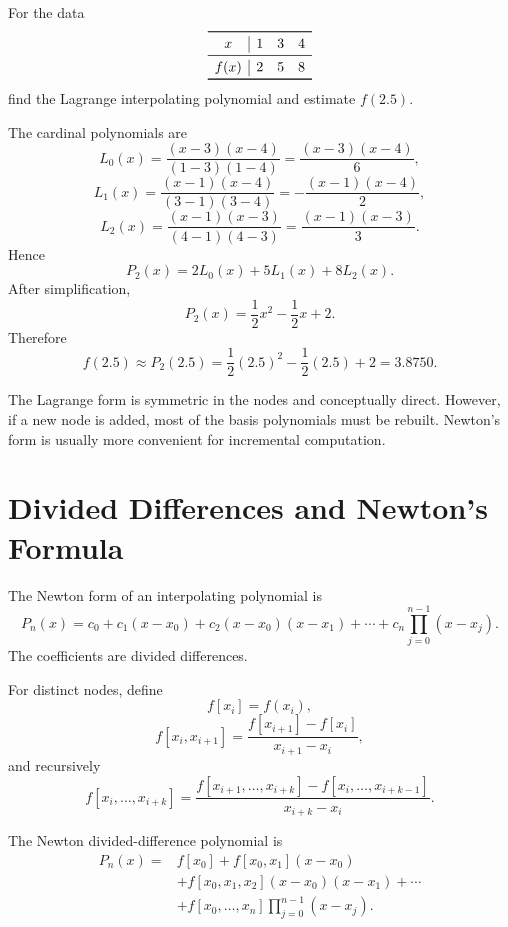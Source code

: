 \begin{example}
For the data
\[
\begin{array}{c|ccc}
\toprule
x&1&3&4\\
\midrule
f(x)&2&5&8\\
\bottomrule
\end{array}
\]
find the Lagrange interpolating polynomial and estimate $f(2.5)$.
\end{example}

\begin{solution}[7.0cm]
The cardinal polynomials are
\[
 L_0(x)=\frac{(x-3)(x-4)}{(1-3)(1-4)}
       =\frac{(x-3)(x-4)}6,
\]
\[
 L_1(x)=\frac{(x-1)(x-4)}{(3-1)(3-4)}
       =-\frac{(x-1)(x-4)}2,
\]
\[
 L_2(x)=\frac{(x-1)(x-3)}{(4-1)(4-3)}
       =\frac{(x-1)(x-3)}3.
\]
Hence
\[
 P_2(x)=2L_0(x)+5L_1(x)+8L_2(x).
\]
After simplification,
\[
 P_2(x)=\frac12x^2-\frac12x+2.
\]
Therefore
\[
 f(2.5)\approx P_2(2.5)
 =\frac12(2.5)^2-\frac12(2.5)+2
 =3.8750.
\]
\end{solution}

\begin{remark}
The Lagrange form is symmetric in the nodes and conceptually direct.  However, if a new node is added, most of the basis polynomials must be rebuilt.  Newton's form is usually more convenient for incremental computation.
\end{remark}

\section{Divided Differences and Newton's Formula}

The Newton form of an interpolating polynomial is
\[
 P_n(x)=c_0+c_1(x-x_0)+c_2(x-x_0)(x-x_1)+\cdots
 +c_n\prod_{j=0}^{n-1}(x-x_j).
\]
The coefficients are divided differences.

\begin{definition}
For distinct nodes, define
\[
 f[x_i]=f(x_i),
\]
\[
 f[x_i,x_{i+1}]
 =\frac{f[x_{i+1}]-f[x_i]}{x_{i+1}-x_i},
\]
and recursively
\[
 f[x_i,\ldots,x_{i+k}]
 =\frac{f[x_{i+1},\ldots,x_{i+k}]
       -f[x_i,\ldots,x_{i+k-1}]}
 {x_{i+k}-x_i}.
\]
\end{definition}

The Newton divided-difference polynomial is
\[
\begin{aligned}
P_n(x)={}&f[x_0]
+f[x_0,x_1](x-x_0)\\
&+f[x_0,x_1,x_2](x-x_0)(x-x_1)+\cdots\\
&+f[x_0,\ldots,x_n]
\prod_{j=0}^{n-1}(x-x_j).
\end{aligned}
\]

